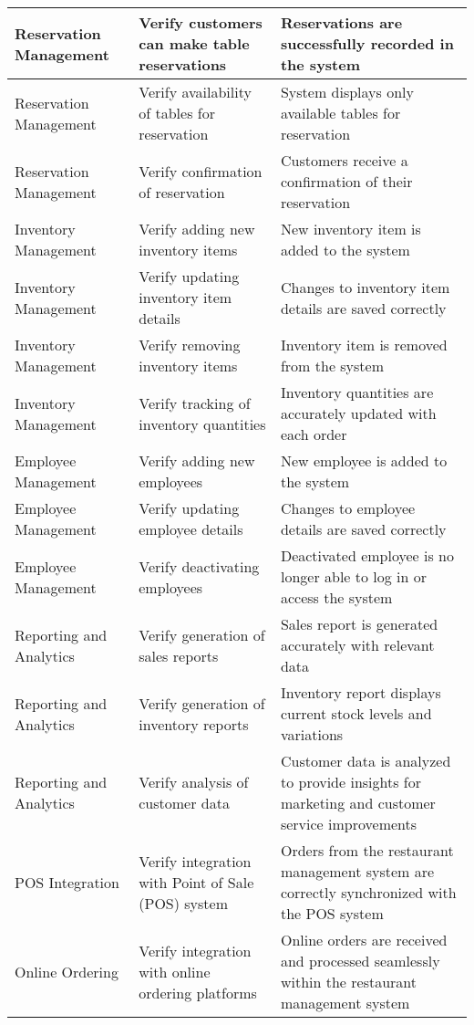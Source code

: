 \documentclass{article}
\begin{document}
\begin{longtable}{|l|p{7cm}|p{5cm}|}
\hline
Reservation Management & Verify customers can make table reservations & Reservations are successfully recorded in the system \\
\hline
Reservation Management & Verify availability of tables for reservation & System displays only available tables for reservation \\
\hline
Reservation Management & Verify confirmation of reservation & Customers receive a confirmation of their reservation \\
\hline
Inventory Management & Verify adding new inventory items & New inventory item is added to the system \\
\hline
Inventory Management & Verify updating inventory item details & Changes to inventory item details are saved correctly \\
\hline
Inventory Management & Verify removing inventory items & Inventory item is removed from the system \\
\hline
Inventory Management & Verify tracking of inventory quantities & Inventory quantities are accurately updated with each order \\
\hline
Employee Management & Verify adding new employees & New employee is added to the system \\
\hline
Employee Management & Verify updating employee details & Changes to employee details are saved correctly \\
\hline
Employee Management & Verify deactivating employees & Deactivated employee is no longer able to log in or access the system \\
\hline
Reporting and Analytics & Verify generation of sales reports & Sales report is generated accurately with relevant data \\
\hline
Reporting and Analytics & Verify generation of inventory reports & Inventory report displays current stock levels and variations \\
\hline
Reporting and Analytics & Verify analysis of customer data & Customer data is analyzed to provide insights for marketing and customer service improvements \\
\hline
POS Integration & Verify integration with Point of Sale (POS) system & Orders from the restaurant management system are correctly synchronized with the POS system \\
\hline
Online Ordering & Verify integration with online ordering platforms & Online orders are received and processed seamlessly within the restaurant management system \\

\end{longtable}
\end{document}
